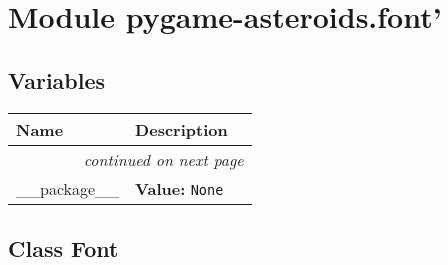 %
%
%


\section{Module pygame-asteroids.font'}

    \label{pygame-asteroids:font'}


  \subsection{Variables}

    \vspace{-1cm}
\hspace{\varindent}\begin{longtable}{|p{\varnamewidth}|p{\vardescrwidth}|l}
\cline{1-2}
\cline{1-2} \centering \textbf{Name} & \centering \textbf{Description}& \\
\cline{1-2}
\endhead\cline{1-2}\multicolumn{3}{r}{\small\textit{continued on next page}}\\\endfoot\cline{1-2}
\endlastfoot\raggedright \_\-\_\-p\-a\-c\-k\-a\-g\-e\-\_\-\_\- & \raggedright \textbf{Value:} 
{\tt None}&\\
\cline{1-2}
\end{longtable}



\subsection{Class Font}

